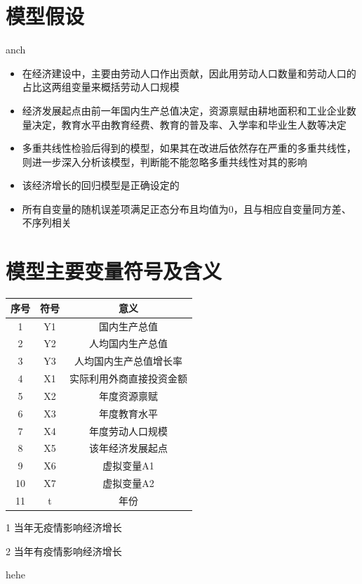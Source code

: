 \documentclass{article}
\begin{document}
	\section{模型假设}
		anch
	\begin{itemize}
		\item 在经济建设中，主要由劳动人口作出贡献，因此用劳动人口数量和劳动人口的占比这两组变量来概括劳动人口规模
		\item 经济发展起点由前一年国内生产总值决定，资源禀赋由耕地面积和工业企业数量决定，教育水平由教育经费、教育的普及率、入学率和毕业生人数等决定
		\item 多重共线性检验后得到的模型，如果其在改进后依然存在严重的多重共线性，则进一步深入分析该模型，判断能不能忽略多重共线性对其的影响
		\item 该经济增长的回归模型是正确设定的
		\item 所有自变量的随机误差项满足正态分布且均值为0，且与相应自变量同方差、不序列相关
	\end{itemize}
	\section{模型主要变量符号及含义}
		\begin{center}
			\begin{threeparttable}
				\setlength{\tabcolsep}{10mm}
				\begin{tabular}{ccc}
				\hline
				序号 & 符号 & 意义\\
				\hline
				1 & Y1 & 国内生产总值\\
				2 & Y2 & 人均国内生产总值\\
				3 & Y3 & 人均国内生产总值增长率\\
				4 & X1 & 实际利用外商直接投资金额\\
				5 & X2 & 年度资源禀赋\\
				6 & X3 & 年度教育水平\\
				7 & X4 & 年度劳动人口规模\\
				8 & X5 & 该年经济发展起点\\
				9 & X6 & 虚拟变量A1\tnote{1}\\
				10 & X7 & 虚拟变量A2\tnote{2}\\
				11 & t & 年份\\
				\hline
				\end{tabular}
				\begin{tablenotes}
					\item [1] 当年无疫情影响经济增长
					\item [2] 当年有疫情影响经济增长
				\end{tablenotes}
			\end{threeparttable}
		\end{center}
		hehe
\end{document}
